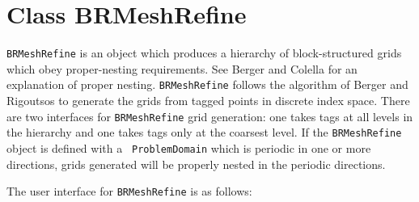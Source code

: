 
\section{Class BRMeshRefine}

{\tt BRMeshRefine} is an object which
produces a hierarchy of block-structured grids which 
obey proper-nesting requirements.   See Berger and Colella
\cite{bergerColella:1989} for an explanation of proper nesting.
{\tt BRMeshRefine} follows the algorithm of Berger and Rigoutsos
\cite{bergerRigoutsos:1991} to generate the grids from tagged points
in discrete index space.    There are two interfaces
for {\tt BRMeshRefine} grid generation: one takes tags at all levels in
the hierarchy and one takes tags only at the coarsest
level.  If the {\tt BRMeshRefine} object is defined with a {\tt
ProblemDomain} which is periodic in one or more directions, grids
generated will be properly nested in the periodic directions.

The user interface for {\tt BRMeshRefine} is as follows:

